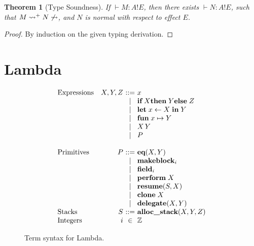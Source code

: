 \documentclass[12pt,mscres,cdtppar,twoside,openright,logo,rightchapter,normalheadings]{infthesis}
\makeatletter
\newtheorem{theorem}{Theorem}[section]
\theoremstyle{definition}
\newcommand{\slab}[1]{\textrm{#1}}
\newcommand{\revto}{\ensuremath{\leftarrow}}
\newcommand{\keyw}[1]{\textbf{#1}}
\newcommand{\Let}{\keyw{let}}
\newcommand{\In}{\keyw{in}}
\newcommand{\eff}{!}
\newcommand{\typc}[3]{#1 \vdash #2 \eff #3}
\newcommand{\reducesto}[0]{\ensuremath{\leadsto}}
\newcommand{\ba}{\begin{array}}
\newcommand{\ea}{\end{array}}
\newenvironment{syntax}{\[\ba{@{}l@{\quad}r@{~}c@{~}l@{}}}{\ea\]\ignorespacesafterend}
\makeatother
\begin{document}
\begin{theorem}[Type Soundness]
If $\typc{}{M : A}{E}$, then there exists $\typc{}{N : A}{E}$, such that
$M \reducesto^+ N \not\reducesto$, and $N$ is normal with respect to
effect $E$.
\end{theorem}
\begin{proof}
By induction on the given typing derivation.
\end{proof}

\section{Lambda}
\label{sec:lambda}

\newcommand{\If}{\keyw{if}}
\newcommand{\Then}{\keyw{then}}
\newcommand{\Else}{\keyw{else}}
\newcommand{\Fun}{\keyw{fun}}
\newcommand{\Perform}{\keyw{perform}}
\newcommand{\Resume}{\keyw{resume}}
\newcommand{\Clone}{\keyw{clone}}
\newcommand{\Makeblock}{\keyw{makeblock}}
\newcommand{\Field}{\keyw{field}}
\newcommand{\Eq}{\keyw{eq}}
\newcommand{\Alloc}{\keyw{alloc\_stack}}
\newcommand{\Error}{\keyw{error}}
\newcommand{\Delegate}{\keyw{delegate}}

\begin{figure}
\begin{syntax}
\slab{Expressions}   &X,Y,Z  &::= & x\\
                     &     &\mid& \If \; X \Then \; Y \Else \; Z\\
                     &     &\mid& \Let \; x \revto X \; \In \; Y\\
                     &     &\mid& \Fun \; x \mapsto Y \\
                     &     &\mid& X\,Y\\
                     &     &\mid& P\\
                     &     &    &\\
\slab{Primitives}    &P    &::= & \Eq(X,Y)\\
                     &     &\mid& \Makeblock_i\\
                     &     &\mid& \Field_i\\
                     &     &\mid& \Perform \; X \\
                     &     &\mid& \Resume(S,X) \\
                     &     &\mid& \Clone \; X\\
                     &     &\mid& \Delegate(X,Y)\\
\slab{Stacks}        &S    &::= & \Alloc (X,Y,Z)\\
\slab{Integers}      &i    &\in & \mathbb{Z} 
\end{syntax}
\caption{Term syntax for Lambda.}\label{fig:lambda-terms}
\end{figure}
\end{document}
